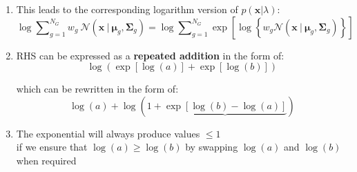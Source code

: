 \documentclass[usenames,dvipsnames]{beamer}
\def\Vec#1{{\boldsymbol{#1}}}
\def\Mat#1{{\boldsymbol{#1}}}
\begin{document}
\begin{frame}
\begin{enumerate}[{~~$\boldsymbol{\bullet}$}]
\item
This leads to the corresponding logarithm version of $p(\Vec{x} | \lambda)$:
%
\begin{equation*}
\log \sum\nolimits_{g=1}^{N_G} w_g ~ {{\mathcal{N}}}( \Vec{x} ~|~ \Vec{\mu}_g, \Mat{\Sigma}_g )
=
\log \sum\nolimits_{g=1}^{N_G} \exp\left[ \log \left\{ w_g {{\mathcal{N}}}( \Vec{x} ~|~ \Vec{\mu}_g, \Mat{\Sigma}_g ) \right\} \right]
\end{equation*}

\item
RHS can be expressed as a {\bf repeated addition} in the form of:
\begin{equation*}
\log\left( \exp\left[\log(a)\right] + \exp\left[\log(b)\right] \right)
\end{equation*}

which can be rewritten in the form of:
\begin{equation*}
\log(a) + \log\left( 1 + \underbrace{\exp\left[ \log(b) - \log(a) \right]} \right)
\end{equation*}

\item
The exponential will always produce values $\leq 1$\\
if we ensure that {$\log(a) \geq \log(b)$} by swapping $\log(a)$ and $\log(b)$ when required

\end{enumerate}
\end{frame}

%
%
%
\end{document}
